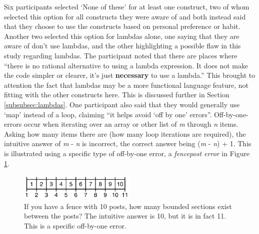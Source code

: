 \documentclass{article}
\begin{document}
            Six participants selected `None of these' for at least one construct, two of whom selected this option for all constructs they were aware of and both instead said that they choose to use the constructs based on personal preference or habit. Another two selected this option for lambdas alone, one saying that they are aware of don't use lambdas, and the other highlighting a possible flaw in this study regarding lambdas. The participant noted that there are places where ``there is no rational alternative to using a lambda expression. It does not make the code simpler or clearer, it's just \textbf{necessary} to use a lambda.'' This brought to attention the fact that lambdas may be a more functional language feature, not fitting with the other constructs here. This is discussed further in Section \ref{subsubsec:lambdas}.
            One participant also said that they would generally use `map' instead of a  loop, claiming ``it helps avoid `off by one' errors''. Off-by-one-errors occur when iterating over an array or other list of \textit{m} through \textit{n} items. Asking how many items there are (how many loop iterations are required), the intuitive answer of \textit{m} - \textit{n} is incorrect, the correct answer being (\textit{m} - \textit{n}) + 1. This is illustrated using a specific type of off-by-one error, a \textit{fencepost error} in Figure \ref{fig:fencepost}.
            \begin{figure}[htbp]
                \centering
                \includegraphics[width=0.5\textwidth]{fencepost}
                \caption{If you have a fence with 10 posts, how many bounded sections exist between the posts? The intuitive answer is 10, but it is in fact 11. This is a specific off-by-one error.}
                \label{fig:fencepost}
            \end{figure}
\end{document}

